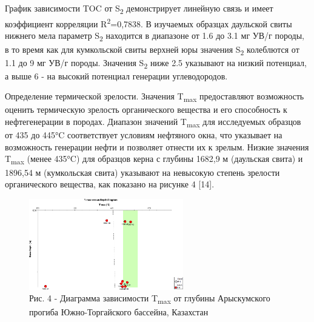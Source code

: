 \begin{multicols}{2}
График зависимости TOC от S\textsubscript{2} демонстрирует линейную
связь и имеет коэффициент корреляции R\textsuperscript{2}=0,7838. В
изучаемых образцах даульской свиты нижнего мела параметр
S\textsubscript{2} находится в диапазоне от 1.6 до 3.1 мг УВ/г породы, в
то время как для кумкольской свиты верхней юры значения
S\textsubscript{2} колеблются от 1.1 до 9 мг УВ/г породы. Значения
S\textsubscript{2} ниже 2.5 указывают на низкий потенциал, а выше 6 - на
высокий потенциал генерации углеводородов.

Определение термической зрелости. Значения T\textsubscript{max}
предоставляют возможность оценить термическую зрелость органического
вещества и его способность к нефтегенерации в породах. Диапазон значений
T\textsubscript{max} для исследуемых образцов от 435 до 445°C
соответствует условиям нефтяного окна, что указывает на возможность
генерации нефти и позволяет отнести их к зрелым. Низкие значения
T\textsubscript{max} (менее 435°C) для образцов керна с глубины 1682,9 м
(даульская свита) и 1896,54 м (кумкольская свита) указывают на невысокую
степень зрелости органического вещества, как показано на рисунке 4
{[}14{]}.
\end{multicols}

\begin{figure}[H]
	\centering
	\includegraphics[width=0.6\textwidth]{assets/1261}
	\caption*{Рис. 4 - Диаграмма зависимости T\textsubscript{max} от глубины Арыскумского прогиба Южно-Торгайского бассейна, Казахстан}
\end{figure}

